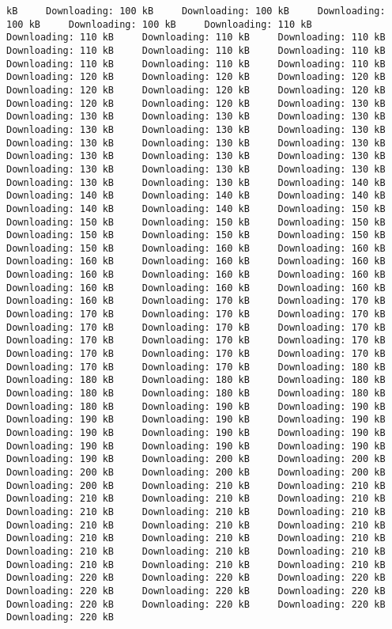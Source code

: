 \documentclass[
  12pt,
  portuguese,
]{report}
\begin{document}
\begin{verbatim}
kB     Downloading: 100 kB     Downloading: 100 kB     Downloading: 100 kB     Downloading: 100 kB     Downloading: 110 kB     Downloading: 110 kB     Downloading: 110 kB     Downloading: 110 kB     Downloading: 110 kB     Downloading: 110 kB     Downloading: 110 kB     Downloading: 110 kB     Downloading: 110 kB     Downloading: 110 kB     Downloading: 120 kB     Downloading: 120 kB     Downloading: 120 kB     Downloading: 120 kB     Downloading: 120 kB     Downloading: 120 kB     Downloading: 120 kB     Downloading: 120 kB     Downloading: 130 kB     Downloading: 130 kB     Downloading: 130 kB     Downloading: 130 kB     Downloading: 130 kB     Downloading: 130 kB     Downloading: 130 kB     Downloading: 130 kB     Downloading: 130 kB     Downloading: 130 kB     Downloading: 130 kB     Downloading: 130 kB     Downloading: 130 kB     Downloading: 130 kB     Downloading: 130 kB     Downloading: 130 kB     Downloading: 130 kB     Downloading: 130 kB     Downloading: 140 kB     Downloading: 140 kB     Downloading: 140 kB     Downloading: 140 kB     Downloading: 140 kB     Downloading: 140 kB     Downloading: 150 kB     Downloading: 150 kB     Downloading: 150 kB     Downloading: 150 kB     Downloading: 150 kB     Downloading: 150 kB     Downloading: 150 kB     Downloading: 150 kB     Downloading: 160 kB     Downloading: 160 kB     Downloading: 160 kB     Downloading: 160 kB     Downloading: 160 kB     Downloading: 160 kB     Downloading: 160 kB     Downloading: 160 kB     Downloading: 160 kB     Downloading: 160 kB     Downloading: 160 kB     Downloading: 160 kB     Downloading: 170 kB     Downloading: 170 kB     Downloading: 170 kB     Downloading: 170 kB     Downloading: 170 kB     Downloading: 170 kB     Downloading: 170 kB     Downloading: 170 kB     Downloading: 170 kB     Downloading: 170 kB     Downloading: 170 kB     Downloading: 170 kB     Downloading: 170 kB     Downloading: 170 kB     Downloading: 170 kB     Downloading: 170 kB     Downloading: 180 kB     Downloading: 180 kB     Downloading: 180 kB     Downloading: 180 kB     Downloading: 180 kB     Downloading: 180 kB     Downloading: 180 kB     Downloading: 180 kB     Downloading: 190 kB     Downloading: 190 kB     Downloading: 190 kB     Downloading: 190 kB     Downloading: 190 kB     Downloading: 190 kB     Downloading: 190 kB     Downloading: 190 kB     Downloading: 190 kB     Downloading: 190 kB     Downloading: 190 kB     Downloading: 190 kB     Downloading: 200 kB     Downloading: 200 kB     Downloading: 200 kB     Downloading: 200 kB     Downloading: 200 kB     Downloading: 200 kB     Downloading: 210 kB     Downloading: 210 kB     Downloading: 210 kB     Downloading: 210 kB     Downloading: 210 kB     Downloading: 210 kB     Downloading: 210 kB     Downloading: 210 kB     Downloading: 210 kB     Downloading: 210 kB     Downloading: 210 kB     Downloading: 210 kB     Downloading: 210 kB     Downloading: 210 kB     Downloading: 210 kB     Downloading: 210 kB     Downloading: 210 kB     Downloading: 210 kB     Downloading: 210 kB     Downloading: 210 kB     Downloading: 220 kB     Downloading: 220 kB     Downloading: 220 kB     Downloading: 220 kB     Downloading: 220 kB     Downloading: 220 kB     Downloading: 220 kB     Downloading: 220 kB     Downloading: 220 kB     Downloading: 220 kB     
\end{verbatim}
\end{document}
